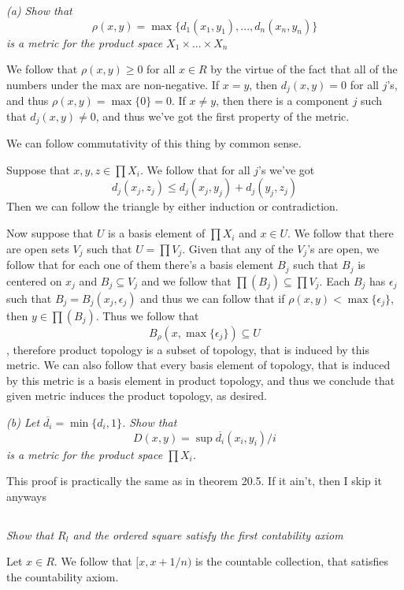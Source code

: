 \documentclass[11pt,oneside,titlepage]{book}
\newcommand{\set}[1]{\{ #1 \}}
\begin{document}
\textit{(a) Show that
  $$\rho(x, y) = \max\set{d_1(x_1, y_1), ..., d_n(x_n, y_n)}$$
  is a metric for the product space $X_1 \times ... \times X_n$
}

We follow that $\rho(x, y) \geq 0$ for all $x \in R$ by the virtue of the fact that all of the
numbers under the max are non-negative. If $x = y$, then $d_j(x, y) = 0$ for all $j$'s, and thus
$\rho(x, y) = \max\set{0} = 0$. If $x \neq y$, then there is a component $j$ such that
$d_j(x, y) \neq 0$, and thus we've got the first property of the metric.

We can follow commutativity of this thing by common sense.

Suppose that $x, y, z \in \prod{X_i}$. We follow that for all $j$'s we've got 
$$d_j(x_j, z_j) \leq d_j(x_j, y_j) + d_j(y_j, z_j)$$
Then we can follow the triangle by either induction or contradiction.

Now suppose that $U$ is a basis element of $\prod{X_i}$ and $x \in U$.
We follow that there are open sets $V_j$
such that $U = \prod{V_j}$. Given that any of the $V_j$'s are open, we follow that for each one
of them there's a basis element $B_j$ such that $B_j$ is centered on $x_j$ and $B_j \subseteq V_j$
and we follow that $\prod(B_j) \subseteq \prod V_j$. Each $B_j$ has  $\epsilon_j$
such that $B_j = B_j(x_j, \epsilon_j)$ and thus we can follow that if
$\rho(x, y) < \max\set{\epsilon_j}$, then $y \in \prod(B_j)$. Thus we follow that
$$B_\rho(x, \max\set{\epsilon_j}) \subseteq U$$, therefore product topology is a subset of
topology, that is induced by this metric. We can also follow that every basis element of
topology, that is induced by this metric is a basis element in product topology, and thus
we conclude that given metric induces the product topology, as desired.

\textit{(b) Let $\overline{d_i} = \min\set{d_i, 1}$. Show that
  $$D(x, y) = \sup{\overline{d_i}(x_i, y_i) / i}$$
  is a metric for the product space $\prod{X_i}$.}

This proof is practically the same as in theorem 20.5. If it ain't, then I skip it anyways

\subsection{}

\textit{Show that $R_l$ and the ordered square satisfy the first contability axiom}

Let $x \in R$. We follow that $[x, x + 1/n)$ is the countable collection, that satisfies the
countability axiom.
\end{document}
